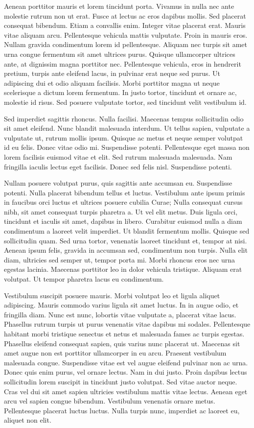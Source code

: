 Aenean porttitor mauris et lorem tincidunt porta. Vivamus in nulla nec ante molestie rutrum non ut erat. Fusce at lectus ac eros dapibus mollis. Sed placerat consequat bibendum. Etiam a convallis enim. Integer vitae placerat erat. Mauris vitae aliquam arcu. Pellentesque vehicula mattis vulputate. Proin in mauris eros. Nullam gravida condimentum lorem id pellentesque. Aliquam nec turpis sit amet urna congue fermentum sit amet ultrices purus. Quisque ullamcorper ultrices ante, at dignissim magna porttitor nec. Pellentesque vehicula, eros in hendrerit pretium, turpis ante eleifend lacus, in pulvinar erat neque sed purus. Ut adipiscing dui et odio aliquam facilisis. Morbi porttitor magna ut neque scelerisque a dictum lorem fermentum. In justo tortor, tincidunt et ornare ac, molestie id risus. Sed posuere vulputate tortor, sed tincidunt velit vestibulum id.

Sed imperdiet sagittis rhoncus. Nulla facilisi. Maecenas tempus sollicitudin odio sit amet eleifend. Nunc blandit malesuada interdum. Ut tellus sapien, vulputate a vulputate ut, rutrum mollis ipsum. Quisque ac metus et neque semper volutpat id eu felis. Donec vitae odio mi. Suspendisse potenti. Pellentesque eget massa non lorem facilisis euismod vitae et elit. Sed rutrum malesuada malesuada. Nam fringilla iaculis lectus eget facilisis. Donec sed felis nisl. Suspendisse potenti.

Nullam posuere volutpat purus, quis sagittis ante accumsan eu. Suspendisse potenti. Nulla placerat bibendum tellus et luctus. Vestibulum ante ipsum primis in faucibus orci luctus et ultrices posuere cubilia Curae; Nulla consequat cursus nibh, sit amet consequat turpis pharetra a. Ut vel elit metus. Duis ligula orci, tincidunt et iaculis sit amet, dapibus in libero. Curabitur euismod nulla a diam condimentum a laoreet velit imperdiet. Ut blandit fermentum mollis. Quisque sed sollicitudin quam. Sed urna tortor, venenatis laoreet tincidunt et, tempor at nisi. Aenean ipsum felis, gravida in accumsan sed, condimentum non turpis. Nulla elit diam, ultricies sed semper ut, tempor porta mi. Morbi rhoncus eros nec urna egestas lacinia. Maecenas porttitor leo in dolor vehicula tristique. Aliquam erat volutpat. Ut tempor pharetra lacus eu condimentum.

Vestibulum suscipit posuere mauris. Morbi volutpat leo et ligula aliquet adipiscing. Mauris commodo varius ligula sit amet luctus. In in augue odio, et fringilla diam. Nunc est nunc, lobortis vitae vulputate a, placerat vitae lacus. Phasellus rutrum turpis ut purus venenatis vitae dapibus mi sodales. Pellentesque habitant morbi tristique senectus et netus et malesuada fames ac turpis egestas. Phasellus eleifend consequat sapien, quis varius nunc placerat ut. Maecenas sit amet augue non est porttitor ullamcorper in eu arcu. Praesent vestibulum malesuada congue. Suspendisse vitae est vel augue eleifend pulvinar non ac urna. Donec quis enim purus, vel ornare lectus. Nam in dui justo. Proin dapibus lectus sollicitudin lorem suscipit in tincidunt justo volutpat. Sed vitae auctor neque. Cras vel dui sit amet sapien ultricies vestibulum mattis vitae lectus. Aenean eget arcu vel sapien congue bibendum. Vestibulum venenatis ornare metus. Pellentesque placerat luctus luctus. Nulla turpis nunc, imperdiet ac laoreet eu, aliquet non elit. 
